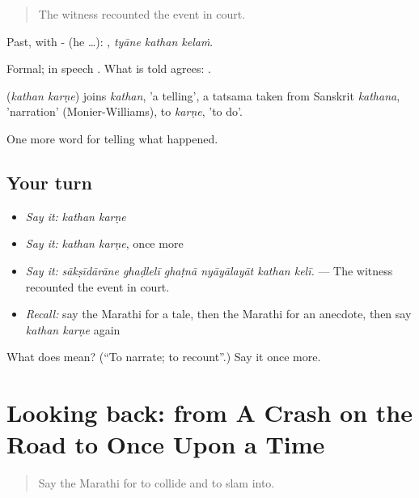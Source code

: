 \begin{quote}
The witness recounted the event in court.
\end{quote}

Past, with - (he …):   , \emph{tyāne kathan kelaṁ}.

Formal; in speech . What is told agrees:   .

\begin{cousinweb}
\textbf{ } (\emph{kathan karṇe}) joins \emph{kathan}, 'a telling', a tatsama taken from Sanskrit \emph{kathana}, 'narration' (Monier-Williams), to \emph{karṇe}, 'to do'.
\end{cousinweb}

\begin{grammarlens}[title={What you've built}]
One more word for telling what happened.
\end{grammarlens}

\subsection*{Your turn}
\begin{itemize}
\raggedright
  \item \emph{Say it:} \emph{kathan karṇe}
  \item \emph{Say it:} \emph{kathan karṇe}, once more
  \item \emph{Say it:} \emph{sākṣīdārāne ghaḍlelī ghaṭnā nyāyālayāt kathan kelī.} — The witness recounted the event in court.
  \item \emph{Recall:} say the Marathi for a tale, then the Marathi for an anecdote, then say \emph{kathan karṇe} again
\end{itemize}

\begin{tcolorbox}[breakable,colback=teal!4,colframe=teal!35!black,title={Before you move on}]
What does   mean? (\textquotedblleft{}To narrate; to recount\textquotedblright{}.) Say it once more.
\end{tcolorbox}
\section[(dialogue)]{Looking back: from A Crash on the Road to Once Upon a Time}

\label{lesson:MR-R303-review-296-303}



\begin{quote}
Say the Marathi for to collide and to slam into.
\end{quote}

